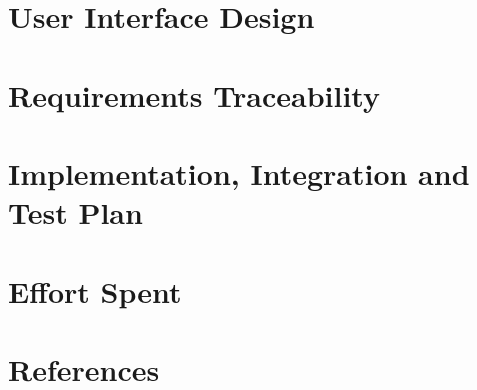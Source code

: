 \documentclass[titlepage]{article}
\begin{document}

\section{User Interface Design}
\pagebreak


\section{Requirements Traceability}
\pagebreak


\section{Implementation, Integration and Test Plan}
\pagebreak


\section{Effort Spent}
\pagebreak


\section{References}
\end{document}
